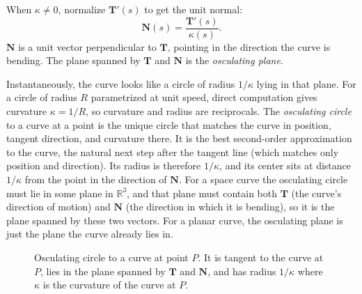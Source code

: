 \documentclass{article}
\begin{document}
When $\kappa \neq 0$, normalize $\mathbf{T}'(s)$ to get the unit normal:
$$\mathbf{N}(s) = \frac{\mathbf{T}'(s)}{\kappa(s)}.$$
$\mathbf{N}$ is a unit vector perpendicular to $\mathbf{T}$, pointing in the direction the curve is bending. The plane spanned by $\mathbf{T}$ and $\mathbf{N}$ is the \textit{osculating plane}.

Instantaneously, the curve looks like a circle of radius $1/\kappa$ lying in that plane. For a circle of radius $R$ parametrized at unit speed, direct computation gives curvature $\kappa = 1/R$, so curvature and radius are reciprocals. The \textit{osculating circle} to a curve at a point is the unique circle that matches the curve in position, tangent direction, and curvature there. It is the best second-order approximation to the curve, the natural next step after the tangent line (which matches only position and direction). Its radius is therefore $1/\kappa$, and its center sits at distance $1/\kappa$ from the point in the direction of $\mathbf{N}$. For a space curve the osculating circle must lie in some plane in $\mathbb{R}^3$, and that plane must contain both $\mathbf{T}$ (the curve's direction of motion) and $\mathbf{N}$ (the direction in which it is bending), so it is the plane spanned by these two vectors. For a planar curve, the osculating plane is just the plane the curve already lies in.
 
\begin{figure}[H]
\centering
{}
\caption{Osculating circle to a curve at point $P$. It is tangent to the curve at $P$, lies in the plane spanned by $\mathbf{T}$ and $\mathbf{N}$, and has radius $1/\kappa$ where $\kappa$ is the curvature of the curve at $P$.}
\label{fig:osculating-circle}
\end{figure}
\end{document}
